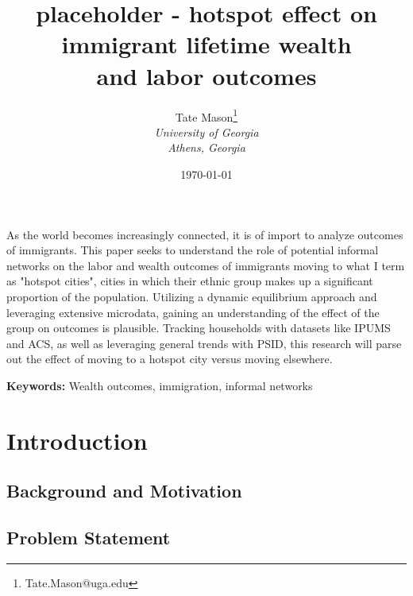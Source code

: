 \documentclass[11pt,a4paper]{article}
\title{placeholder - hotspot effect on immigrant lifetime wealth \\
and labor outcomes}
\author{
    Tate Mason\thanks{Tate.Mason@uga.edu} \\
    \textit{University of Georgia} \\
    \textit{Athens, Georgia} \\
}
\date{\today}
\newenvironment{abstract}%
{\cleardoublepage\null \vfill\begin{center}%
\bfseries \abstractname \end{center}}%
{\vfill\null}
\begin{document}
\maketitle
\thispagestyle{empty}

\begin{abstract}
\noindent %
As the world becomes increasingly connected, it is of import to analyze outcomes of immigrants. This paper seeks to understand the role of potential informal 
networks on the labor and wealth outcomes of immigrants moving to what I term as "hotspot cities", cities in which their ethnic group makes up a significant 
proportion of the population. Utilizing a dynamic equilibrium approach and leveraging extensive microdata, gaining an understanding of the effect of 
the group on outcomes is plausible. Tracking households with datasets like IPUMS and ACS, as well as leveraging general trends with PSID, this research will
parse out the effect of moving to a hotspot city versus moving elsewhere.

\vspace{0.3cm}
\noindent \textbf{Keywords:} %
Wealth outcomes, immigration, informal networks
\end{abstract}

\newpage
\setcounter{page}{1}

\section{Introduction}
\label{sec:introduction}


\subsection{Background and Motivation}
\label{subsec:background}


\subsection{Problem Statement}
\label{subsec:problem}
\end{document}
